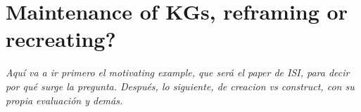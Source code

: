 
\chapter{Maintenance of KGs, reframing or recreating?}
\label{chapter:reframing}

\textit{Aquí va a ir primero el motivating example, que será el paper de ISI, para decir por qué surge la pregunta. Después, lo siguiente, de creacion vs construct, con su propia evaluación y demás.}

